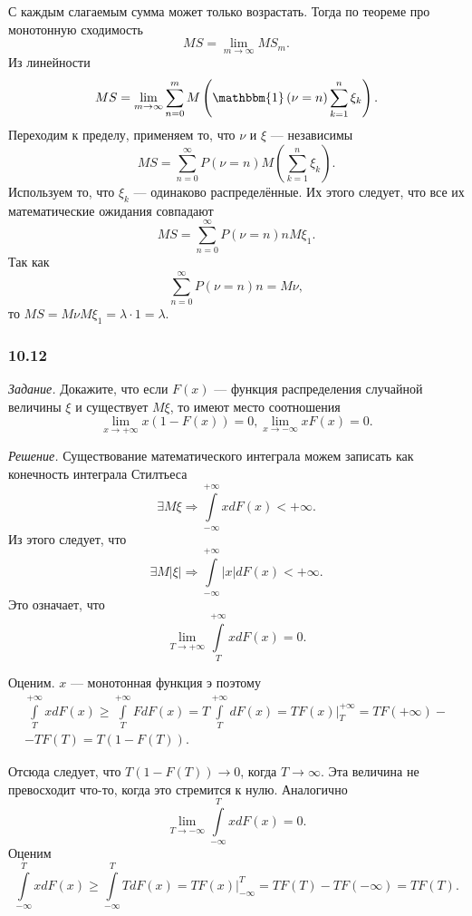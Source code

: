 С каждым слагаемым сумма может только возрастать.
Тогда по теореме про монотонную сходимость
$$MS =
\lim \limits_{m \to \infty } MS_m.$$
Из линейности
$$MS =
\lim \limits_{m \to \infty } \sum \limits_{n=0}^m M \left( \mathbbm{1} \left( \nu = n \right) \sum \limits_{k=1}^n \xi_k \right).$$
Переходим к пределу, применяем то, что $ \nu $ и $ \xi $ --- независимы
$$MS =
\sum \limits_{n=0}^{ \infty } P \left( \nu = n \right) M \left( \sum \limits_{k=1}^n \xi_k \right).$$
Используем то, что $ \xi_k$ --- одинаково распределённые.
Их этого следует, что все их математические ожидания совпадают
$$MS =
\sum \limits_{n=0}^{ \infty } P \left( \nu = n \right) nM \xi_1.$$
Так как
$$\sum \limits_{n=0}^{ \infty } P \left( \nu = n \right) n =
M \nu,$$
то $MS = M \nu M \xi_1 = \lambda \cdot 1 = \lambda $.

\subsubsection*{10.12}

\textit{Задание.} Докажите, что если $F \left( x \right) $ --- функция распределения случайной величины $ \xi $ и существует $M \xi $, то имеют место соотношения
$$ \lim \limits_{x \to + \infty } x \left( 1-F \left( x \right) \right) = 0,
\lim \limits_{x \to - \infty } xF \left( x \right) = 0.$$

\textit{Решение.} Существование математического интеграла можем записать как конечность интеграла Стилтьеса
$$ \exists M \xi \Rightarrow \int \limits_{- \infty }^{+ \infty } xdF \left( x \right) < + \infty.$$
Из этого следует, что
$$ \exists M \left| \xi \right| \Rightarrow \int \limits_{- \infty }^{+ \infty } \left| x \right| dF \left( x \right) < + \infty.$$
Это означает, что
$$ \lim \limits_{T \to + \infty } \int \limits_T^{+ \infty } xdF \left( x \right) =
0.$$

Оценим.
$x$ --- монотонная функция
э поэтому
\begin{equation*}
\begin{split}
\int \limits_T^{+ \infty } xdF \left( x \right) \geq
\int \limits_T^{+ \infty } FdF \left( x \right) =
T \int \limits_T^{+ \infty } dF \left( x \right) =
\left. TF \left( x \right) \right|_T^{+ \infty } =
TF \left( + \infty \right) - \\
- TF \left( T \right) =
T \left( 1 - F \left( T \right) \right).
\end{split}
\end{equation*}

Отсюда следует, что $T \left( 1 - F \left( T \right) \right) \rightarrow 0$, когда $T \rightarrow \infty $.
Эта величина не превосходит что-то, когда это стремится к нулю.
Аналогично
$$ \lim \limits_{T \to - \infty } \int \limits_{- \infty }^T xdF \left( x \right) =
0.$$
Оценим
$$ \int \limits_{- \infty }^T xdF \left( x \right) \geq
\int \limits_{- \infty }^T TdF \left( x \right) =
\left. TF \left( x \right) \right|_{- \infty }^T =
TF \left( T \right) - TF \left( - \infty \right) =
TF \left( T \right).$$

